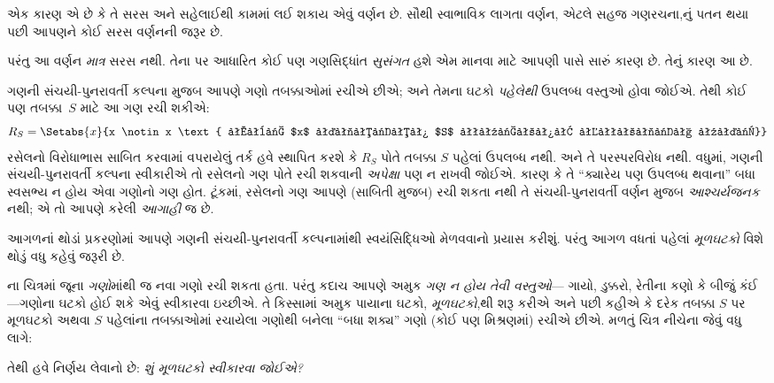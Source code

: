 એક કારણ એ છે કે તે સરસ અને સહેલાઈથી કામમાં લઈ શકાય એવું વર્ણન
છે. સૌથી સ્વાભાવિક લાગતા વર્ણન, એટલે સહજ ગણરચના,નું પતન થયા
પછી આપણને કોઈ સરસ વર્ણનની જરૂર છે.

પરંતુ આ વર્ણન \emph{માત્ર} સરસ નથી. તેના પર આધારિત કોઈ પણ
ગણસિદ્ધાંત \emph{સુસંગત} હશે એમ માનવા માટે આપણી પાસે સારું
કારણ છે. તેનું કારણ આ છે.

ગણની સંચયી-પુનરાવર્તી કલ્પના મુજબ આપણે ગણો તબક્કાઓમાં રચીએ
છીએ; અને તેમના ઘટકો \emph{પહેલેથી} ઉપલબ્ધ વસ્તુઓ
હોવા જોઈએ. તેથી કોઈ પણ તબક્કા~$S$ માટે આ ગણ રચી શકીએ:
\[
R_S = \Setabs{x}{x \notin x \text{ અને $x$ તબક્કા $S$ પહેલાં ઉપલબ્ધ હતો}}
\]
રસેલનો વિરોધાભાસ સાબિત કરવામાં વપરાયેલું તર્ક હવે સ્થાપિત
કરશે કે $R_S$ પોતે તબક્કા $S$ પહેલાં ઉપલબ્ધ નથી. અને તે
પરસ્પરવિરોધ નથી. વધુમાં, ગણની સંચયી-પુનરાવર્તી કલ્પના
સ્વીકારીએ તો રસેલનો ગણ પોતે રચી શકવાની \emph{અપેક્ષા} પણ
ન રાખવી જોઈએ. કારણ કે તે ``ક્યારેય પણ ઉપલબ્ધ થવાના'' બધા
સ્વસભ્ય ન હોય એવા ગણોનો ગણ હોત. ટૂંકમાં, રસેલનો ગણ આપણે
(સાબિતી મુજબ) રચી શકતા નથી તે સંચયી-પુનરાવર્તી વર્ણન મુજબ
\emph{આશ્ચર્યજનક} નથી; એ તો આપણે કરેલી \emph{આગાહી} જ છે.
\endgroup

\begingroup
\makeatletter{}\makeatother

\label{guunit:OLP-0535}


આગળનાં થોડાં પ્રકરણોમાં આપણે ગણની સંચયી-પુનરાવર્તી કલ્પનામાંથી
સ્વયંસિદ્ધિઓ મેળવવાનો પ્રયાસ કરીશું. પરંતુ આગળ વધતાં પહેલાં
\emph{મૂળઘટકો} વિશે થોડું વધુ કહેવું જરૂરી છે.

ના ચિત્રમાં જૂના \emph{ગણો}માંથી જ નવા ગણો
રચી શકતા હતા. પરંતુ કદાચ આપણે અમુક \emph{ગણ ન હોય તેવી વસ્તુઓ}---
ગાયો, ડુક્કરો, રેતીના કણો કે બીજું કંઈ---ગણોના ઘટકો
હોઈ શકે એવું સ્વીકારવા ઇચ્છીએ. તે કિસ્સામાં અમુક પાયાના ઘટકો,
\emph{મૂળઘટકો},થી શરૂ કરીએ અને પછી કહીએ કે દરેક તબક્કા $S$ પર
મૂળઘટકો અથવા $S$ પહેલાંના તબક્કાઓમાં રચાયેલા ગણોથી બનેલા
``બધા શક્ય'' ગણો (કોઈ પણ મિશ્રણમાં) રચીએ છીએ.
મળતું ચિત્ર નીચેના જેવું વધુ લાગે:
\begin{center}
\end{center}
તેથી હવે નિર્ણય લેવાનો છે: \emph{શું મૂળઘટકો સ્વીકારવા જોઈએ?}

